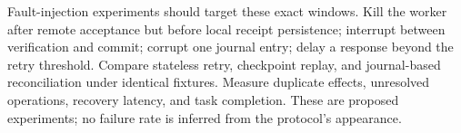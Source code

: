 Fault-injection experiments should target these exact windows. Kill the worker after remote acceptance but before local receipt persistence; interrupt between verification and commit; corrupt one journal entry; delay a response beyond the retry threshold. Compare stateless retry, checkpoint replay, and journal-based reconciliation under identical fixtures. Measure duplicate effects, unresolved operations, recovery latency, and task completion. These are proposed experiments; no failure rate is inferred from the protocol's appearance.

